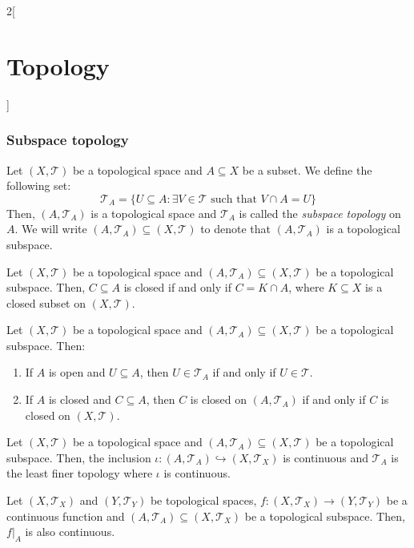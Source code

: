 \documentclass[../../../main.tex]{subfiles}
\begin{document}
\begin{multicols}{2}[\section{Topology}]
  \subsubsection{Subspace topology}
  \begin{definition}
    Let $(X,\mathcal{T})$ be a topological space and $A\subseteq X$ be a subset. We define the following set: $$\mathcal{T}_A=\{U\subseteq A:\exists V\in\mathcal{T}\text{ such that }V\cap A=U\}$$ Then, $(A,\mathcal{T}_A)$ is a topological space and $\mathcal{T}_A$ is called the \textit{subspace topology} on $A$. We will write $(A,\mathcal{T}_A)\subseteq (X,\mathcal{T})$ to denote that $(A,\mathcal{T}_A)$ is a topological subspace.
  \end{definition}
  \begin{prop}
    Let $(X,\mathcal{T})$ be a topological space and $(A,\mathcal{T}_A)\subseteq (X,\mathcal{T})$ be a topological subspace. Then, $C\subseteq A$ is closed if and only if $C=K\cap A$, where $K\subseteq X$ is a closed subset on $(X,\mathcal{T})$.
  \end{prop}
  \begin{prop}
    Let $(X,\mathcal{T})$ be a topological space and $(A,\mathcal{T}_A)\subseteq (X,\mathcal{T})$ be a topological subspace. Then:
    \begin{enumerate}
      \item If $A$ is open and $U\subseteq A$, then $U\in\mathcal{T}_A$ if and only if $U\in\mathcal{T}$.
      \item If $A$ is closed and $C\subseteq A$, then $C$ is closed on $(A,\mathcal{T}_A)$ if and only if $C$ is closed on $(X,\mathcal{T})$.
    \end{enumerate}
  \end{prop}
  \begin{prop}
    Let $(X,\mathcal{T})$ be a topological space and $(A,\mathcal{T}_A)\subseteq (X,\mathcal{T})$ be a topological subspace. Then, the inclusion $\iota:(A,\mathcal{T}_A)\hookrightarrow (X,\mathcal{T}_X)$ is continuous and $\mathcal{T}_A$ is the least finer topology where $\iota$ is continuous.
  \end{prop}
  \begin{corollary}
    Let $(X,\mathcal{T}_X)$ and $(Y,\mathcal{T}_Y)$ be topological spaces, $f:(X,\mathcal{T}_X)\rightarrow (Y,\mathcal{T}_Y)$ be a continuous function and $(A,\mathcal{T}_A)\subseteq (X,\mathcal{T}_X)$ be a topological subspace. Then, $f|_A$ is also continuous.
  \end{corollary}
  \begin{prop}

\end{prop}
\end{multicols}
\end{document}
